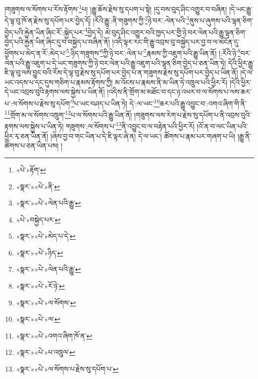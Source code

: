 །གཟུགས་ལ་སོགས་པ་རོས་རྟོགས་\footnote{«པེ་»རྟོག་}པ། །རྒྱུ་ཆོས་རྗེས་སུ་དཔག་པ་སྟེ། །དུ་བས་བུད་ཤིང་འགྱུར་བ་བཞིན། །དེ་ཡང་རྒྱུ་དེ་ལྟ་བུ་ཁོ་ན་རྗེས་སུ་དཔོག་པར་བྱེད་དོ། །རོའི་རྒྱུ་:ནི་གཟུགས་ཀྱི་\footnote{«སྣར་»«པེ་»ནི་}ཉེ་བར་:ལེན་པའི་\footnote{«སྣར་»«པེ་»ལེན་པའི་རྒྱུ་}ནུས་པ་ཞུགས་པའི་ལྷན་ཅིག་བྱེད་པའི་རྐྱེན་ཡིན་ཞིང་རོ་:སྐྱེད་པར་\footnote{«པེ་»བསྐྱེད་པར་}བྱེད་དེ། མེ་བུད་ཤིང་འགྱུར་བའི་ཁྱད་པར་གྱི་ཉེ་བར་ལེན་པའི་རྒྱུ་ལྷན་ཅིག་བྱེད་པའི་རྐྱེན་ཡིན་ཞིང་དུ་བ་བསྐྱེད་པ་བཞིན་ནོ། །འདི་ལྟར་རང་གི་རྒྱུ་འབྲས་བུ་བསྐྱེད་པར་བྱ་བ་ལ་མངོན་དུ་ཕྱོགས་པ་མེད་ན་རོ་:མེད་པ་\footnote{«སྣར་»«པེ་»མེད་པ་དེ་}:ཉིད་གཟུགས་\footnote{«སྣར་»«པེ་»ཉིད་}ཀྱི་ཉེ་བར་:ལེན་པ་\footnote{«སྣར་»«པེ་»ལེན་པའི་རྒྱུ་}རྣམས་ཀྱི་འཇུག་པའི་རྒྱུ་ཡིན་ནོ། །:རོའི་ཉེ་\footnote{«སྣར་»«པེ་»རོ་ཉེ་}བར་ལེན་པའི་རྒྱུ་འཇུག་པ་དེ་ཡང་གཟུགས་ཀྱི་ཉེ་བར་ལེན་པའི་རྒྱུ་འཇུག་པའི་ལྷན་ཅིག་བྱེད་པ་ཅན་ཡིན་ཏེ། དེའི་ཕྱིར་རྒྱུ་ཇི་ལྟ་བུ་ལས་བྱུང་བའི་རོས་དེ་ལྟ་བུ་རྗེས་སུ་དཔོག་པར་བྱེད་པ་ན་གཟུགས་རྗེས་སུ་དཔོག་པར་བྱེད་པ་ཡིན་ནོ། །དེ་ལ་ཡང་འདས་པ་དང་དུས་གཅིག་པ་རྣམས་རྟོགས་ཀྱི། མ་འོངས་པ་རྣམས་ནི་མ་ཡིན་ཏེ་འཁྲུལ་པའི་ཕྱིར་རོ། །དེའི་ཕྱིར་དེ་ཡང་འབྲས་བུའི་རྟགས་ལས་སྐྱེས་པ་ཡིན་ནོ། །འདིས་ནི་གྲོག་མ་མཐོང་བ་དང་ཉ་འཕར་བ་ལ་སོགས་པ་ལས་ཆར་པ་:ལ་སོགས་པ་རྗེས་སུ་དཔོག་\footnote{«སྣར་»«པེ་»ལ་སོགས་}པ་ཡང་བཤད་པ་ཡིན་ཏེ། དེ་:ལ་ཡང་\footnote{«སྣར་»«པེ་»ལ་}ཆར་པའི་རྒྱུ་འབྱུང་བ་:འགའ་ཞིག་གི་ནི་\footnote{«སྣར་»«པེ་»འགའ་ཞིག་ཁོ་ན་}གྲོག་མ་ལ་སོགས་འཁྲུག་\footnote{«སྣར་»«པེ་»པ་འཁྲུལ་}པ་ལ་སོགས་པའི་རྒྱུ་ཡིན་ནོ། །གཟུགས་ལས་རེག་པ་རྗེས་སུ་དཔོག་པ་ནི་འབྲས་བུའི་རྟགས་ལས་སྐྱེས་པ་ཡིན་ཏེ། གཟུགས་:ལ་སོགས་པ་\footnote{«སྣར་»«པེ་»ལ་སོགས་པ་རྗེས་སུ་དཔོག་པ་}ནི་འབྱུང་བ་ལ་བརྟེན་པའི་ཕྱིར་རོ། །འོ་ན་བ་ལང་ཡིན་པའི་ཕྱིར་རྭ་ཅན་ཡིན་ནོ། །ཞེས་བྱ་བ་གང་ཡིན་པ་དེ་ཇི་ལྟར་ཞེ་ན། དེ་ལ་ཡང་། ཚོགས་པ་རྣམ་པར་གཞག་པ་ཡི། །རྒྱུ་ནི་ཚོགས་པ་ཅན་ཡིན་པས། །

